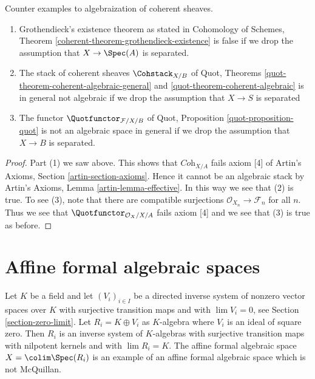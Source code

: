 \begin{lemma}
\label{lemma-counter-Grothendieck-existence}
Counter examples to algebraization of coherent sheaves.
\begin{enumerate}
\item Grothendieck's existence theorem as stated in
Cohomology of Schemes, Theorem \ref{coherent-theorem-grothendieck-existence}
is false if we drop the assumption that $X \to \Spec(A)$ is separated.
\item The stack of coherent sheaves $\Cohstack_{X/B}$
of Quot, Theorems \ref{quot-theorem-coherent-algebraic-general} and
\ref{quot-theorem-coherent-algebraic} is in general
not algebraic if we drop the assumption that $X \to S$ is separated
\item The functor $\Quotfunctor_{\mathcal{F}/X/B}$ of
Quot, Proposition \ref{quot-proposition-quot}
is not an algebraic space in general if we drop the assumption
that $X \to B$ is separated.
\end{enumerate}
\end{lemma}

\begin{proof}
Part (1) we saw above. This shows that $\textit{Coh}_{X/A}$ fails
axiom [4] of Artin's Axioms, Section \ref{artin-section-axioms}. Hence it
cannot be an algebraic stack by Artin's Axioms, Lemma
\ref{artin-lemma-effective}.
In this way we see that (2) is true. To see (3), note that
there are compatible surjections $\mathcal{O}_{X_n} \to \mathcal{F}_n$
for all $n$. Thus we see that $\Quotfunctor_{\mathcal{O}_X/X/A}$
fails axiom [4] and we see that (3) is true as before.
\end{proof}






\section{Affine formal algebraic spaces}
\label{section-affine-formal-algebraic-space}

\noindent
Let $K$ be a field and let $(V_i)_{i \in I}$ be a directed inverse
system of nonzero vector spaces over $K$ with surjective transition maps and
with $\lim V_i = 0$, see Section \ref{section-zero-limit}.
Let $R_i = K \oplus V_i$ as $K$-algebra where $V_i$ is
an ideal of square zero. Then $R_i$ is an inverse system of
$K$-algebras with surjective transition maps with nilpotent kernels
and with $\lim R_i = K$. The affine formal
algebraic space $X = \colim \Spec(R_i)$ is an example of an affine
formal algebraic space which is not McQuillan.


